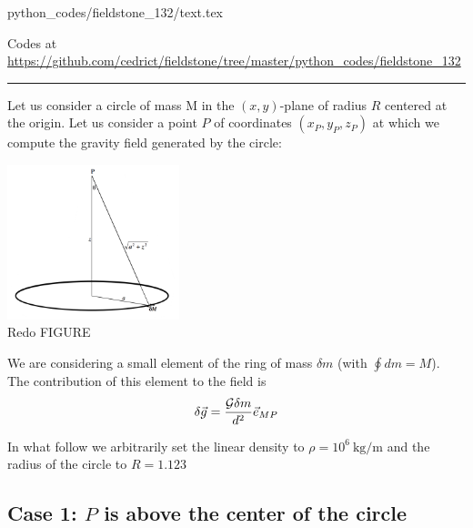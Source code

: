 \begin{flushright} {\tiny {\color{gray} python\_codes/fieldstone\_132/text.tex}} \end{flushright}



\begin{center}

Codes at \url{https://github.com/cedrict/fieldstone/tree/master/python_codes/fieldstone_132}
\end{center}

\par\noindent\rule{\textwidth}{0.4pt}

Let us consider a circle of mass M in the $(x,y)$-plane of radius $R$ centered at the origin.
Let us consider a point $P$ of coordinates $(x_P,y_P,z_P)$ at which we compute the 
gravity field generated by the circle:

\begin{center}
\includegraphics[width=5cm]{python_codes/fieldstone_132/images/setup.png}\\
{\captionfont Redo FIGURE}
\end{center}

We are considering a small element of the ring of mass $\delta m$ (with $\oint dm = M$). 
The contribution of this element to the field is
\[
\delta \vec{g} = \frac{{\cal G} \delta m}{d^2} \vec{e}_{MP}
\]

In what follow we arbitrarily set the linear density to $\rho=10^6~\si{\kg\per\meter}$ and 
the radius of the circle to $R=1.123$

\subsection*{Case 1: $P$ is above the center of the circle}

